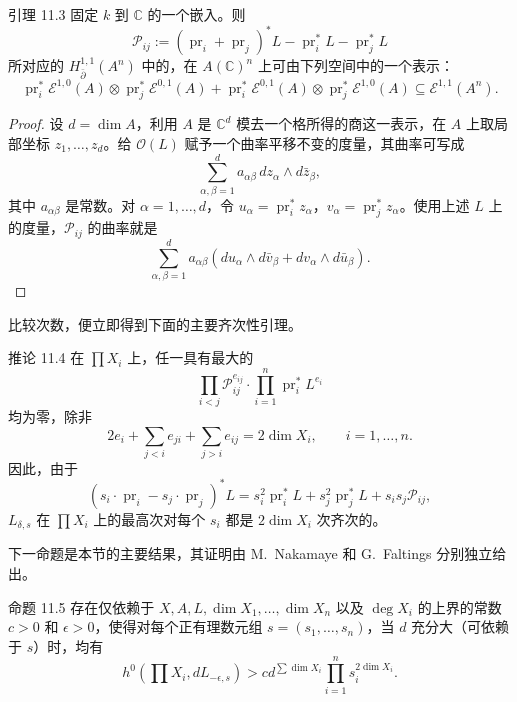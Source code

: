 \begin{statement}{引理 11.3}
固定 $k$ 到 $\mathbb C$ 的一个嵌入。则
\[
\mathscr P_{ij}:=(\operatorname{pr}_i+\operatorname{pr}_j)^*L-\operatorname{pr}_i^*L-\operatorname{pr}_j^*L
\]
所对应的 $H^{1,1}_{\bar\partial}(A^n)$ 中的，在 $A(\mathbb C)^n$ 上可由下列空间中的一个表示：
\[
\operatorname{pr}_i^*\mathscr E^{1,0}(A)\otimes\operatorname{pr}_j^*\mathscr E^{0,1}(A)
+\operatorname{pr}_i^*\mathscr E^{0,1}(A)\otimes\operatorname{pr}_j^*\mathscr E^{1,0}(A)
\subseteq\mathscr E^{1,1}(A^n).
\]
\end{statement}
\begin{proof}
设 $d=\dim A$，利用 $A$ 是 $\mathbb C^d$ 模去一个格所得的商这一表示，在 $A$ 上取局部坐标 $z_1,\ldots,z_d$。给 $\mathcal O(L)$ 赋予一个曲率平移不变的度量，其曲率可写成
\[
\sum_{\alpha,\beta=1}^d a_{\alpha\beta}\,dz_\alpha\wedge d\bar z_\beta,
\]
其中 $a_{\alpha\beta}$ 是常数。对 $\alpha=1,\ldots,d$，令 $u_\alpha=\operatorname{pr}_i^*z_\alpha$，$v_\alpha=\operatorname{pr}_j^*z_\alpha$。使用上述 $L$ 上的度量，$\mathscr P_{ij}$ 的曲率就是
\[
\sum_{\alpha,\beta=1}^d a_{\alpha\beta}
(du_\alpha\wedge d\bar v_\beta+dv_\alpha\wedge d\bar u_\beta).
\]
\end{proof}
比较次数，便立即得到下面的主要齐次性引理。
\begin{statement}{推论 11.4}
在 $\prod X_i$ 上，任一具有最大的
\[
\prod_{i<j}\mathscr P_{ij}^{e_{ij}}\cdot\prod_{i=1}^n\operatorname{pr}_i^*L^{e_i}
\]
均为零，除非
\[
2e_i+\sum_{j<i}e_{ji}+\sum_{j>i}e_{ij}=2\dim X_i,
\qquad i=1,\ldots,n.
\]
因此，由于
\[
(s_i\cdot\operatorname{pr}_i-s_j\cdot\operatorname{pr}_j)^*L
=s_i^2\operatorname{pr}_i^*L+s_j^2\operatorname{pr}_j^*L+s_is_j\mathscr P_{ij},
\]
$L_{\delta,s}$ 在 $\prod X_i$ 上的最高次对每个 $s_i$ 都是 $2\dim X_i$ 次齐次的。
\end{statement}
下一命题是本节的主要结果，其证明由 M.~Nakamaye 和 G.~Faltings 分别独立给出。
\begin{statement}{命题 11.5}
存在仅依赖于 $X,A,L,\dim X_1,\ldots,\dim X_n$ 以及 $\deg X_i$ 的上界的常数 $c>0$ 和 $\epsilon>0$，使得对每个正有理数元组 $s=(s_1,\ldots,s_n)$，当 $d$ 充分大（可依赖于 $s$）时，均有
\[
h^0\!\left(\prod X_i,dL_{-\epsilon,s}\right)
>c d^{\sum\dim X_i}\prod_{i=1}^n s_i^{2\dim X_i}.
\]
\end{statement}
